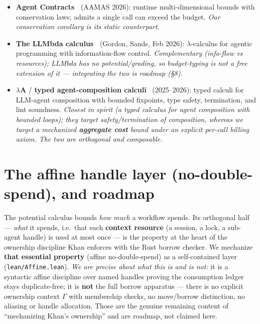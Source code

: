 \documentclass[11pt]{article}
\theoremstyle{plain}
\begin{document}
\begin{itemize}
  \emph{Our delegation split adapts this to sub-agents.}
\item \textbf{Agent Contracts~\cite{agentcontracts2026}} (AAMAS 2026): runtime multi-dimensional
  bounds with conservation laws; admits a single call can exceed the budget. \emph{Our conservation
  corollary is its static counterpart.}
\item \textbf{The LLMbda calculus~\cite{llmbda2026}} (Gordon, Sands, Feb 2026): $\lambda$-calculus
  for agentic programming with information-flow control. \emph{Complementary (info-flow vs
  resources); LLMbda has no potential/grading, so budget-typing is not a free extension of it ---
  integrating the two is roadmap (\S8).}
\item \boldmath$\lambda$\textbf{A} / \textbf{typed agent-composition calculi}~\cite{lambdaA2026}
  \unboldmath(2025--2026): typed calculi for LLM-agent composition with bounded fixpoints, type
  safety, termination, and lint soundness. \emph{Closest in spirit (a typed calculus for agent
  composition with bounded loops); they target safety/termination of composition, whereas we target
  a mechanized \textbf{aggregate cost} bound under an explicit per-call billing axiom. The two are
  orthogonal and composable.}
\end{itemize}

\section{The affine handle layer (no-double-spend), and roadmap}

The potential calculus bounds \emph{how much} a workflow spends. Its orthogonal half --- \emph{what}
it spends, i.e.\ that each \textbf{context resource} (a session, a lock, a sub-agent handle) is
used at most once --- is the property at the heart of the ownership discipline Khan enforces with
the Rust borrow checker. We mechanize \textbf{that essential property} (affine no-double-spend) as
a self-contained layer (\texttt{lean/Affine.lean}). \emph{We are precise about what this is and is
not:} it is a syntactic affine discipline over named handles proving the consumption ledger stays
duplicate-free; it is \textbf{not} the full borrow apparatus --- there is no explicit ownership
context $\Gamma$ with membership checks, no move/borrow distinction, no aliasing or handle
allocation. Those are the genuine remaining content of ``mechanizing Khan's ownership'' and are
roadmap, not claimed here.
\end{document}
